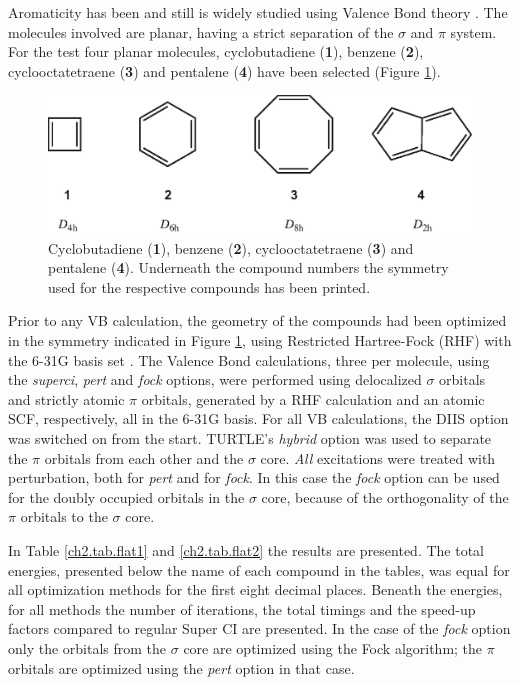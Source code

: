 Aromaticity has been and still is widely studied using Valence Bond theory \cite{cooper1,cooper2,remcolowdin,indacene,fowler,jenneskens,cyclohexatriene,bestbenzene,benzyne}. The molecules involved are planar, having a strict separation of the $\sigma$ and $\pi$ system. For the test four planar molecules, cyclobutadiene (\textbf{1}), benzene (\textbf{2}), cyclooctatetraene (\textbf{3}) and pentalene (\textbf{4}) have been selected (Figure \ref{ch2.fig.compounds}).
\begin{figure}[htdp]
\center
\includegraphics[scale=0.85]{orbopt/figures/compounds.eps}
\caption{Cyclobutadiene (\textbf{1}), benzene (\textbf{2}), cyclooctatetraene (\textbf{3}) and pentalene (\textbf{4}). Underneath the compound numbers the symmetry used for the respective compounds has been printed.}
\label{ch2.fig.compounds}
\end{figure}

Prior to any VB calculation, the geometry of the compounds had been optimized in the symmetry indicated in Figure \ref{ch2.fig.compounds}, using Restricted Hartree-Fock (RHF) with the \mbox{6-31G} basis set \cite{631g1,631g2}. The Valence Bond calculations, three per molecule, using the \textit{superci}, \textit{pert} and \textit{fock} options, were performed using delocalized $\sigma$ orbitals and strictly atomic $\pi$ orbitals, generated by a RHF calculation and an atomic SCF, respectively, all in the 6-31G basis. For all VB calculations, the DIIS option was switched on from the start. TURTLE's \textit{hybrid} option was used to separate the $\pi$ orbitals from each other and the $\sigma$ core. \textit{All} excitations were treated with perturbation, both for \textit{pert} and for \textit{fock}. In this case the \textit{fock} option can be used for the doubly occupied orbitals in the $\sigma$ core, because of the orthogonality of the $\pi$ orbitals to the $\sigma$ core. 

In Table \ref{ch2.tab.flat1} and \ref{ch2.tab.flat2} the results are presented. The total energies, presented below the name of each compound in the tables, was equal for all optimization methods for the first eight decimal places. Beneath the energies, for all methods the number of iterations, the total timings and the speed-up factors compared to regular Super CI are presented. In the case of the \textit{fock} option only the orbitals from the $\sigma$ core are optimized using the Fock algorithm; the $\pi$ orbitals are optimized using the \textit{pert} option in that case.

